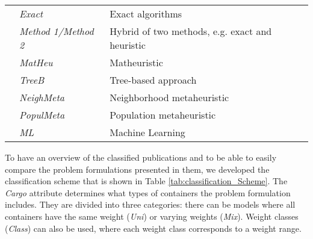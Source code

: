 \documentclass[preprint,12pt,authoryear]{elsarticle}
\begin{document}
\begin{table}
{\begin{tabular}{lll}
\cline{2-3}
                          & \textit{Exact}     & Exact algorithms                                                                                                                                         \\ 
\cline{2-3}
                          & \textit{Method 1/Method 2}    & Hybrid of two methods, e.g. exact and heuristic                                                                                                                               \\ 
\cline{2-3}
                          & \textit{MatHeu}    & Matheuristic                                                                                                                                             \\ 
\cline{2-3}
                          & \textit{TreeB}     & Tree-based approach                                                                                                                                      \\ 
\cline{2-3}
                          & \textit{NeighMeta} & Neighborhood metaheuristic                                                                                                                               \\ 
\cline{2-3}
                          & \textit{PopulMeta} & Population metaheuristic                                                                                                                                 \\ 
\cline{2-3}
                          & \textit{ML}        & Machine Learning                                                                                                                                         \\
\cline{2-3}
\end{tabular}
}
\end{table}

To have an overview of the classified publications and to be able to easily compare the problem formulations presented in them, we developed the classification scheme that is shown in Table \ref{tab:classification_Scheme}. The \textit{Cargo} attribute determines what types of containers the problem formulation includes. They are divided into three categories: there can be models where all containers have the same weight (\textit{Uni}) or varying weights (\textit{Mix}). Weight classes (\textit{Class}) can also be used, where each weight class corresponds to a weight range.
\end{document}
